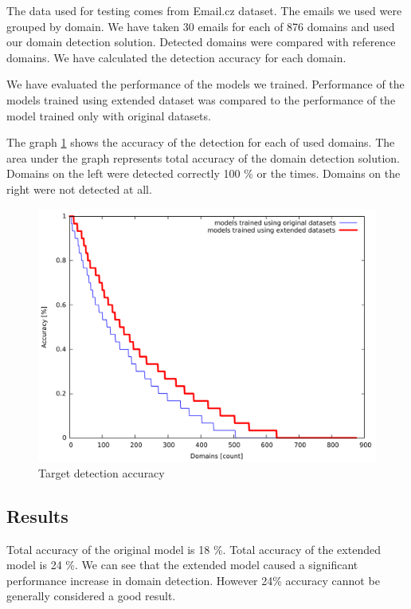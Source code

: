 \documentclass[thesis=B,english]{FITthesis}[2012/10/20]
\begin{document}
\par The data used for testing comes from Email.cz dataset. The emails we used were grouped by domain.
We have taken 30 emails for each of 876 domains and used our domain detection solution. Detected domains were compared with reference domains. We have calculated the detection accuracy for each domain.

\par We have evaluated the performance of the models we trained. Performance of the models trained using extended dataset was compared to the performance of the model trained only with original datasets.

The graph \ref{plot_target_detection} shows the accuracy of the detection for each of used domains. The area under the graph represents total accuracy of the domain detection solution. Domains on the left were detected correctly 100 \% or the times. Domains on the right were not detected at all.

\begin{figure}[!ht]
    \centering
    \caption[Target detection accuracy]{Target detection accuracy\protect\footnotemark }
    \label{plot_target_detection}
    \includegraphics[width=1.0\textwidth]{plot_target_detection.pdf}
\end{figure}


\subsection{Results}
Total accuracy of the original model is 18 \%. Total accuracy of the extended model is 24 \%.
We can see that the extended model caused a significant performance increase in domain detection.
However 24\% accuracy cannot be generally considered a good result.
\end{document}
